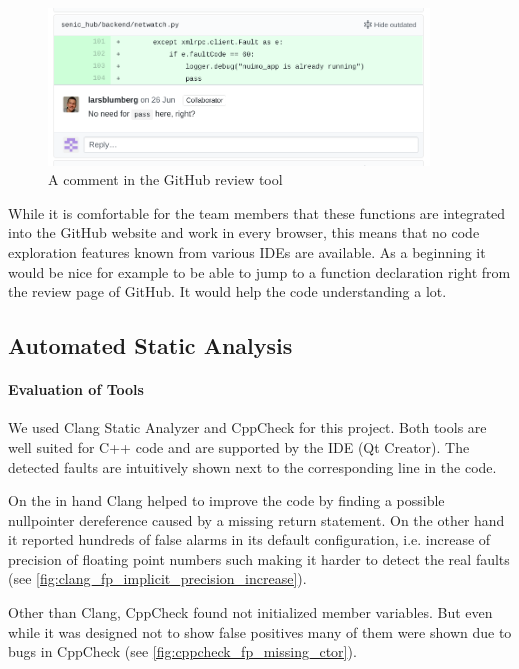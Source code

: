 \documentclass{scrartcl}
\begin{document}
\begin{figure}[h]
	\centering
	\includegraphics[width=0.9\textwidth]{img/github_review_comment}
	\caption[GitHub Review Comment]{A comment in the GitHub review tool}
	\label{fig:github_review_comment}
\end{figure}

While it is comfortable for the team members that these functions are integrated into the GitHub website and work in every browser, this means that no code exploration features known from various IDEs are available. As a beginning it would be nice for example to be able to jump to a function declaration right from the review page of GitHub. It would help the code understanding a lot.

\subsection{Automated Static Analysis}

\paragraph{Evaluation of Tools}

We used Clang Static Analyzer and CppCheck for this project.
Both tools are well suited for C++ code and are supported by the IDE (Qt Creator). The detected faults are intuitively shown next to the corresponding line in the code.

On the in hand Clang helped to improve the code by finding a possible nullpointer dereference caused by a missing return statement. On the other hand it reported hundreds of false alarms in its default configuration, i.e. increase of precision of floating point numbers such making it harder to detect the real faults (see \vref{fig:clang_fp_implicit_precision_increase}).

Other than Clang, CppCheck found not initialized member variables. But even while it was designed not to show false positives many of them were shown due to bugs in CppCheck (see \vref{fig:cppcheck_fp_missing_ctor}).
\end{document}

